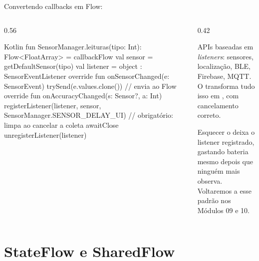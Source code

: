 \documentclass[aspectratio=169,10pt]{beamer}
\begin{document}
\begin{frame}[fragile]{Convertendo callbacks em Flow: }
  \begin{columns}[T]
    \begin{column}{0.56\textwidth}
\begin{codigo}[title=Sensor do aparelho como Flow]{Kotlin}
fun SensorManager.leituras(tipo: Int): Flow<FloatArray> =
  callbackFlow {
    val sensor = getDefaultSensor(tipo)
    val listener = object : SensorEventListener {
      override fun onSensorChanged(e: SensorEvent) {
        trySend(e.values.clone())   // envia ao Flow
      }
      override fun onAccuracyChanged(s: Sensor?, a: Int) {}
    }
    registerListener(listener, sensor,
      SensorManager.SENSOR_DELAY_UI)
    // obrigatório: limpa ao cancelar a coleta
    awaitClose { unregisterListener(listener) }
  }
\end{codigo}
    \end{column}
    \begin{column}{0.42\textwidth}
      \begin{conceito}
        APIs baseadas em \emph{listeners}: sensores, localização, BLE, Firebase, MQTT. O  transforma tudo isso em , com cancelamento correto.
      \end{conceito}
      \begin{atencao}
        Esquecer o  deixa o listener registrado, gastando bateria mesmo depois que ninguém mais observa. Voltaremos a esse padrão nos Módulos 09 e 10.
      \end{atencao}
    \end{column}
  \end{columns}
\end{frame}

\section{StateFlow e SharedFlow}
\end{document}
